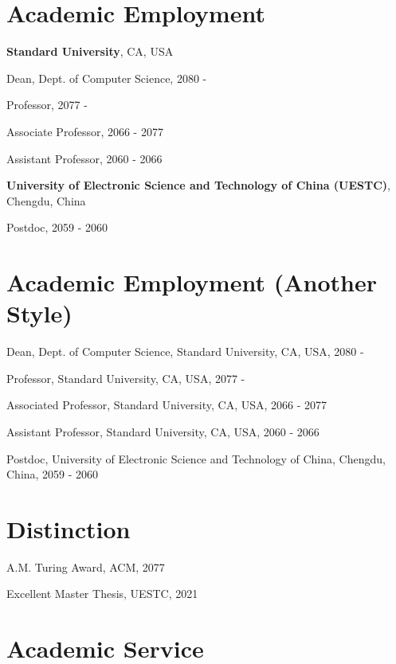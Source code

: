 \documentclass{article}
\newcommand{\cvsection}[1]{\section*{\rmfamily#1}}
\begin{document}
 \hfill {} \hfill {} \hfill {}

 \hfill {} \hfill {} \hfill {}

 \hfill {} \hfill {} \hfill {}


\cvsection{Academic Employment}
\indent

\textbf{Standard University}, CA, USA

\hspace{2em}Dean, Dept. of Computer Science, 2080 - 

\hspace{2em}Professor, 2077 - 

\hspace{2em}Associate Professor, 2066 - 2077

\hspace{2em}Assistant Professor, 2060 - 2066

\textbf{University of Electronic Science and Technology of China (UESTC)}, Chengdu, China

\hspace{2em}Postdoc, 2059 - 2060


\cvsection{Academic Employment (Another Style)}
\indent

Dean, Dept. of Computer Science, Standard University, CA, USA, 2080 -

Professor, Standard University, CA, USA, 2077 -

Associated Professor, Standard University, CA, USA, 2066 - 2077

Assistant Professor, Standard University, CA, USA, 2060 - 2066

Postdoc, University of Electronic Science and Technology of China, Chengdu, China, 2059 - 2060




\cvsection{Distinction}
\indent

A.M. Turing Award, ACM, 2077

Excellent Master Thesis, UESTC, 2021


\cvsection{Academic Service}
\end{document}
